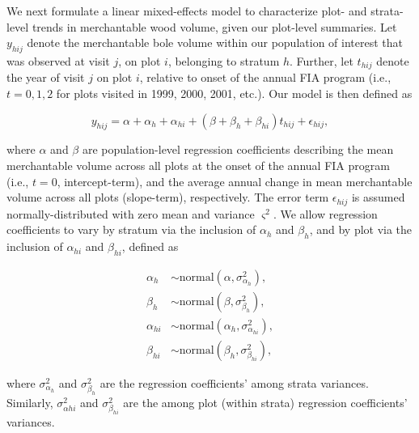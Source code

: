 \documentclass[11pt]{article}
\begin{document}
We next formulate a linear mixed-effects model to characterize plot- and strata-level trends in merchantable wood volume, given our plot-level summaries. Let $y_{hij}$ denote the merchantable bole volume within our population of interest that was observed at visit $j$, on plot $i$, belonging to stratum $h$. Further, let $t_{hij}$ denote the year of visit $j$ on plot $i$, relative to onset of the annual FIA program (i.e., $t=0,1,2$ for plots visited in 1999, 2000, 2001, etc.). Our model is then defined as
\begin{linenomath*}
\begin{equation}\label{model2}
    y_{hij} = \alpha + \alpha_{h} + \alpha_{hi} + (\beta + \beta_{h} + \beta_{hi}) t_{hij} + \epsilon_{hij},
\end{equation}
\end{linenomath*}
where $\alpha$ and $\beta$ are population-level regression coefficients describing the mean merchantable volume across all plots at the onset of the annual FIA program (i.e., $t=0$, intercept-term), and the average annual change in mean merchantable volume across all plots (slope-term), respectively. The error term $\epsilon_{hij}$ is assumed normally-distributed with zero mean and variance $\varsigma^{2}$. We allow regression coefficients to vary by stratum via the inclusion of $\alpha_{h}$ and $\beta_{h}$, and by plot via the inclusion of $\alpha_{hi}$ and $\beta_{hi}$, defined as
\begin{linenomath*}
\begin{align}
    \alpha_{h} &\sim \mathrm{normal}(\alpha, \sigma_{\alpha_{h}}^2), \label{model2:ah} \\ 
    \beta_{h} &\sim \mathrm{normal}(\beta, \sigma_{\beta_{h}}^2), \label{model2:bh} \\
    \alpha_{hi} &\sim \mathrm{normal}(\alpha_{h}, \sigma_{\alpha_{hi}}^2), \label{model2:ahi} \\
    \beta_{hi} &\sim \mathrm{normal}(\beta_{h}, \sigma_{\beta_{hi}}^2), \label{model2:bhi}
\end{align}
\end{linenomath*}
where $\sigma_{\alpha_{h}}^2$ and $\sigma_{\beta_{h}}^2$ are the regression coefficients' among strata variances. Similarly, $\sigma_{\alpha{hi}}^2$ and $\sigma_{\beta_{hi}}^2$ are the among plot (within strata) regression coefficients' variances.
\end{document}
